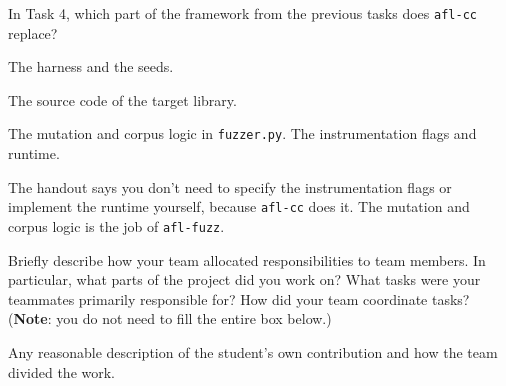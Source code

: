 \documentclass[addpoints]{exam}
\newcommand{\Code}[1]{\texttt{#1}}
\begin{document}
\begin{questions}
  \vspace{12pt}
\question[1] In Task 4, which part of the framework from the previous
  tasks does \Code{afl-cc} replace?
  \begin{choices}
  \item The harness and the seeds.
  \item The source code of the target library.
  \item The mutation and corpus logic in \Code{fuzzer.py}.
  \CorrectChoice The instrumentation flags and runtime.
  \end{choices}
  \begin{solution}
    The handout says you don't need to specify the instrumentation
    flags or implement the runtime yourself, because \Code{afl-cc}
    does it. The mutation and corpus logic is the job of
    \Code{afl-fuzz}.
  \end{solution}

\newpage

\question[3] Briefly describe how your team allocated responsibilities
  to team members. In particular, what parts of the project did you
  work on?  What tasks were your teammates primarily responsible for?
  How did your team coordinate tasks? (\textbf{Note}: you do not need to fill
  the entire box below.)%
  \begin{solution}
    Any reasonable description of the student's own contribution and
    how the team divided the work.
  \end{solution}

\end{questions}
\end{document}
